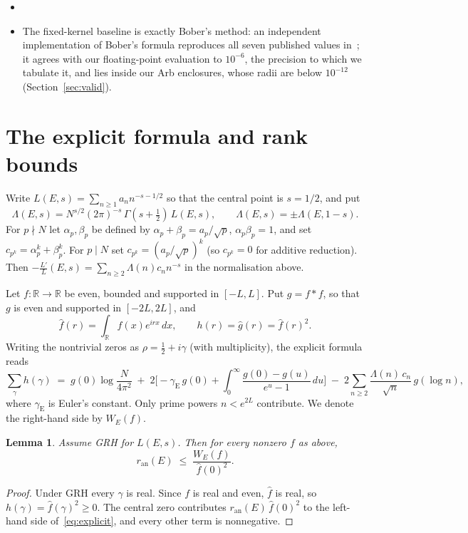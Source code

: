 \documentclass[11pt]{amsart}
\newtheorem{lemma}[theorem]{Lemma}
\theoremstyle{remark}
\theoremstyle{definition}
\newcommand{\R}{\mathbb{R}}
\newcommand{\ran}{r_{\mathrm{an}}}
\newcommand{\BoardBrief}{[board results: run scripts/make\_board.py]}\newcommand{\BoardDetail}{}\newcommand{\BoardTrend}{}}
\begin{document}
\begin{itemize}
$2\,481\,819\,193$ primes, is $[34.39360281\pm4.6\cdot10^{-9}]$ (Section~\ref{sec:4239}).
\item \BoardBrief
\item The fixed-kernel baseline is exactly Bober's method: an independent implementation of Bober's formula reproduces all seven published values in~\cite{Bober,KSW}; it agrees with our floating-point evaluation
to $10^{-6}$, the precision to which we tabulate it, and lies inside our Arb enclosures, whose radii are
below $10^{-12}$ (Section~\ref{sec:valid}).
\end{itemize}

\section{The explicit formula and rank bounds}

Write $L(E,s)=\sum_{n\ge1} a_n n^{-s-1/2}$ so that the central point is $s=1/2$, and put
\[
\Lambda(E,s) = N^{s/2}(2\pi)^{-s}\,\Gamma(s+\tfrac12)\,L(E,s), \qquad \Lambda(E,s)=\pm\Lambda(E,1-s).
\]
For $p\nmid N$ let $\alpha_p,\beta_p$ be defined by $\alpha_p+\beta_p=a_p/\sqrt p$, $\alpha_p\beta_p=1$, and set $c_{p^k}=\alpha_p^k+\beta_p^k$. For $p\mid N$ set $c_{p^k}=(a_p/\sqrt p)^k$ (so $c_{p^k}=0$ for additive reduction). Then $-\frac{L'}{L}(E,s)=\sum_{n\ge2}\Lambda(n)c_n n^{-s}$ in the normalisation above.

Let $f\colon\R\to\R$ be even, bounded and supported in $[-L,L]$. Put $g=f*f$, so that $g$ is even and supported in $[-2L,2L]$, and
\[
\hat f(r)=\int_{\R} f(x)e^{irx}\,dx,\qquad h(r)=\hat g(r)=\hat f(r)^2 .
\]
Writing the nontrivial zeros as $\rho=\tfrac12+i\gamma$ (with multiplicity), the explicit formula reads
\begin{equation}\label{eq:explicit}
\sum_{\gamma} h(\gamma) \;=\; g(0)\log\frac{N}{4\pi^2}
\;+\;2\Big[-\gamma_{\mathrm E}\,g(0)+\int_0^{\infty}\frac{g(0)-g(u)}{e^{u}-1}\,du\Big]
\;-\;2\sum_{n\ge 2}\frac{\Lambda(n)\,c_n}{\sqrt n}\,g(\log n),
\end{equation}
where $\gamma_{\mathrm E}$ is Euler's constant. Only prime powers $n<e^{2L}$ contribute. We denote the right-hand side by $W_E(f)$.

\begin{lemma}\label{lem:bound}
Assume GRH for $L(E,s)$. Then for every nonzero $f$ as above,
\[
\ran(E)\;\le\;\frac{W_E(f)}{\hat f(0)^2}.
\]
\end{lemma}
\begin{proof}
Under GRH every $\gamma$ is real. Since $f$ is real and even, $\hat f$ is real, so $h(\gamma)=\hat f(\gamma)^2\ge0$. The central zero contributes $\ran(E)\,\hat f(0)^2$ to the left-hand side of~\eqref{eq:explicit}, and every other term is nonnegative.
\end{proof}
\end{document}
